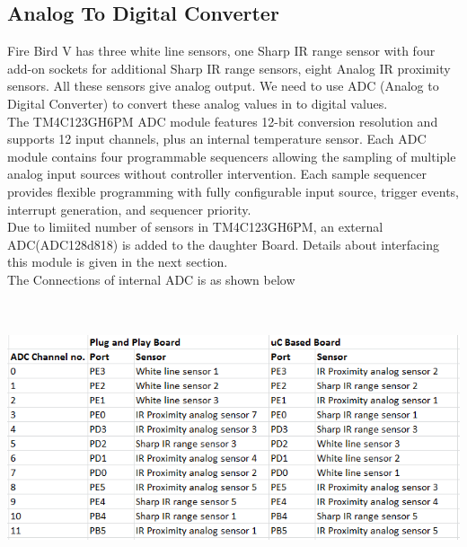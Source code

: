 \documentclass[a4paper,10pt,oneside]{article}
\begin{document}
		\subsection{\huge \textbf{Analog To Digital Converter}}
			{Fire Bird V has three white line sensors, one Sharp IR range sensor with four add-on sockets for additional Sharp IR range sensors, eight Analog IR proximity sensors. All these sensors give analog output.  We need to use ADC (Analog to Digital Converter) to convert  these analog values in to digital values.}\\
			{The TM4C123GH6PM ADC module features 12-bit conversion resolution and supports 12 input channels, plus an internal temperature sensor. Each ADC module contains four programmable sequencers allowing the sampling of multiple analog input sources without controller intervention. Each sample sequencer provides flexible programming with fully configurable input source, trigger events, interrupt generation, and sequencer priority.}\\
			{Due to limiited number of sensors in TM4C123GH6PM, an external ADC(ADC128d818) is added to the daughter Board. Details about interfacing this module is given in the next section.}\\
			The Connections of internal ADC is as shown below
			\begin{center}
				\includegraphics[width=15cm, height=8cm]{ADC}
			\end{center}
\end{document}
